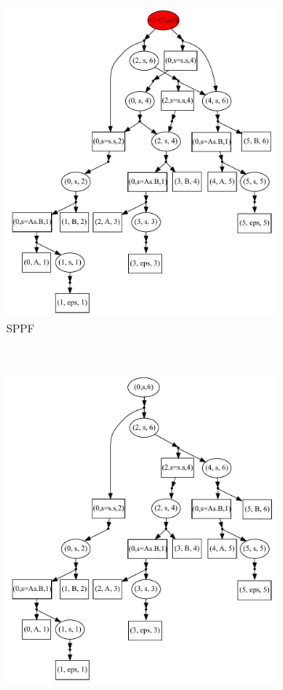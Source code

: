 \begin{figure}[ht]
    \begin{center}
    \centering
    \begin{subfigure}[b]{0.3\textwidth}
        \includegraphics[width=\textwidth]{dot/Brackets.pdf}
        \caption{SPPF}
        \label{sppf}        
    \end{subfigure}
    ~
    \begin{subfigure}[b]{0.3\textwidth}
        \includegraphics[width=\textwidth]{dot/Brackets1.pdf}

\end{subfigure}
\end{center}
\end{figure}
